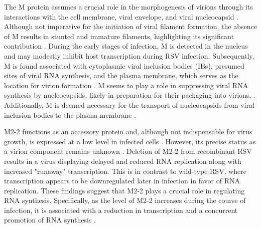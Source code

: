 The M protein assumes a crucial role in the morphogenesis of virions through its interactions with the cell membrane, viral envelope, and viral nucleocapsid \cite{Li2008AssociationProtein, Marty2003AssociationCells}. Although not imperative for the initiation of viral filament formation, the absence of M results in stunted and immature filaments, highlighting its significant contribution \cite{Mitra2012TheFilaments}. During the early stages of infection, M is detected in the nucleus and may modestly inhibit host transcription during RSV infection. Subsequently, M is found associated with cytoplasmic viral inclusion bodies (IBs), presumed sites of viral RNA synthesis, and the plasma membrane, which serves as the location for virion formation \cite{Ghildyal2006CentralInfection}. M seems to play a role in suppressing viral RNA synthesis by nucleocapsids, likely in preparation for their packaging into virions, \cite{Ghildyal2006CentralInfection, NarayanTalukdar2022RespiratoryVirus}. Additionally, M is deemed necessary for the transport of nucleocapsids from viral inclusion bodies to the plasma membrane \cite{Mitra2012TheFilaments, Collins2013RespiratoryDisease}.

M2-2 functions as an accessory protein and, although not indispensable for virus growth, is expressed at a low level in infected cells \cite{Cheng2005OverexpressionReplication, Melero2006MolecularVirus}. However, its precise status as a virion component remains unknown \cite{Collins2013RespiratoryDisease}. Deletion of M2-2 from recombinant RSV results in a virus displaying delayed and reduced RNA replication along with increased "runaway" transcription. This is in contrast to wild-type RSV, where transcription appears to be downregulated later in infection in favor of RNA replication. These findings suggest that M2-2 plays a crucial role in regulating RNA synthesis. Specifically, as the level of M2-2 increases during the course of infection, it is associated with a reduction in transcription and a concurrent promotion of RNA synthesis \cite{Teng1998IdentificationParticles}.

